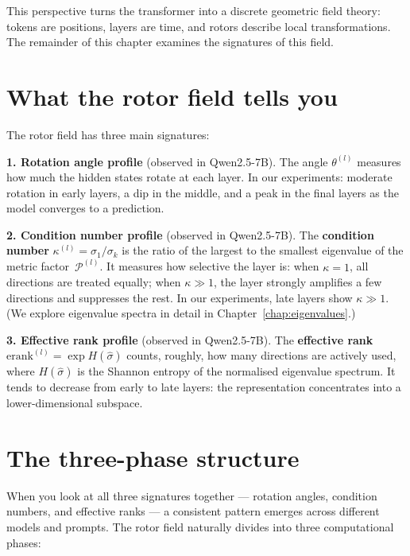 \documentclass[11pt, twoside, openright]{memoir}
\newcommand{\metric}[1]{\mathcal{P}^{(#1)}} %
\numberwithin{equation}{chapter}
\begin{document}
This perspective turns the transformer into a discrete geometric field
theory: tokens are positions, layers are time, and rotors describe local
transformations.  The remainder of this chapter examines the signatures
of this field.

\section{What the rotor field tells you}

The rotor field has three main signatures:

\begin{finding}
\textbf{1. Rotation angle profile} (observed in Qwen2.5-7B).
The angle $\theta^{(l)}$ measures how much the hidden states rotate at
each layer.  In our experiments: moderate rotation in early layers, a
dip in the middle, and a peak in the final layers as the model
converges to a prediction.
\end{finding}

\begin{finding}
\textbf{2. Condition number profile} (observed in Qwen2.5-7B).
The \textbf{condition number} $\kappa^{(l)} = \sigma_1/\sigma_k$ is
the ratio of the largest to the smallest eigenvalue of the metric
factor~$\metric{l}$.  It measures how selective the layer is: when
$\kappa = 1$, all directions are treated equally; when $\kappa \gg 1$,
the layer strongly amplifies a few directions and suppresses the rest.
In our experiments, late layers show $\kappa \gg 1$.  (We explore
eigenvalue spectra in detail in Chapter~\ref{chap:eigenvalues}.)
\end{finding}

\begin{finding}
\textbf{3. Effective rank profile} (observed in Qwen2.5-7B).
The \textbf{effective rank} $\mathrm{erank}^{(l)} = \exp H(\hat\sigma)$
counts, roughly, how many directions are actively used, where
$H(\hat\sigma)$ is the Shannon entropy of the normalised eigenvalue
spectrum.  It tends to decrease from early to late layers: the
representation concentrates into a lower-dimensional subspace.
\end{finding}

\section{The three-phase structure}

When you look at all three signatures together --- rotation angles,
condition numbers, and effective ranks --- a consistent pattern emerges
across different models and prompts.  The rotor field naturally divides
into three computational phases:
\end{document}
